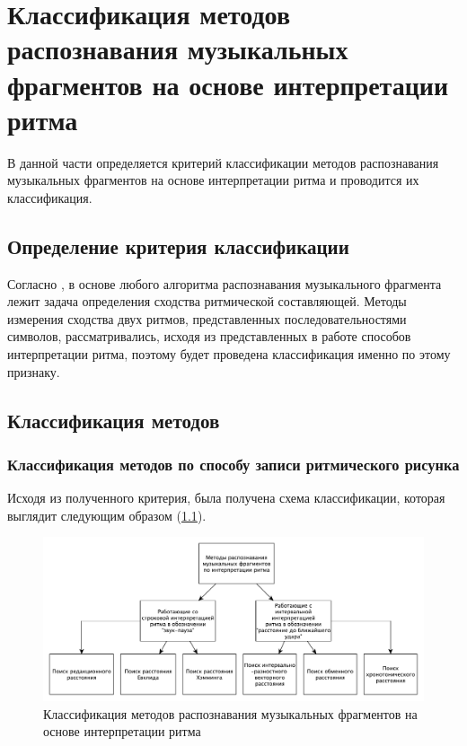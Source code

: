 \newpage 

\chapter{Классификация методов распознавания музыкальных фрагментов на основе интерпретации ритма}

В данной части определяется критерий классификации методов распознавания музыкальных фрагментов на основе интерпретации ритма и проводится их классификация.

\section{Определение критерия классификации}

Согласно \cite{bib12}, в основе любого алгоритма распознавания музыкального фрагмента лежит задача определения сходства ритмической составляющей. Методы измерения сходства двух ритмов, представленных последовательностями символов, рассматривались, исходя из представленных в работе способов интерпретации ритма, поэтому будет проведена классификация именно по этому признаку.

\section{Классификация методов}

\subsection{Классификация методов по способу записи ритмического рисунка}
\par Исходя из полученного критерия, была получена схема классификации, которая выглядит следующим образом (\ref{img:class}).
\newpage

\begin{figure}[h!]
    \centering
    \includegraphics[scale=0.4]{img/class.pdf}
    \caption{Классификация методов распознавания музыкальных фрагментов на основе интерпретации ритма}
    \label{img:class}
\end{figure}

